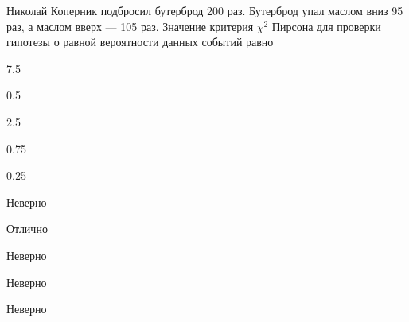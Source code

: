 
\begin{question}
Николай Коперник подбросил бутерброд 200 раз. Бутерброд упал маслом вниз
95 раз, а маслом вверх — 105 раз. Значение критерия \(\chi^2\) Пирсона
для проверки гипотезы о равной вероятности данных событий равно
\begin{answerlist}
  \item 7.5
  \item 0.5
  \item 2.5
  \item 0.75
  \item 0.25
\end{answerlist}
\end{question}

\begin{solution}
\begin{answerlist}
  \item Неверно
  \item Отлично
  \item Неверно
  \item Неверно
  \item Неверно
\end{answerlist}
\end{solution}

